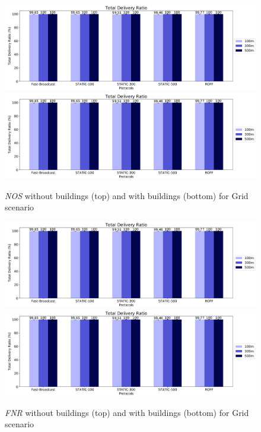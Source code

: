 		\begin{figure}[H]
			\centering
			\includegraphics[width=1.0\textwidth]{immagini/grid-300/b0/nos}
			\includegraphics[width=1.0\textwidth]{immagini/grid-300/b1/nos}
			\caption{\textit{NOS} without buildings (top) and with buildings (bottom) for Grid scenario}
			\label{fig:grid-nos}
		\end{figure}
	
		\begin{figure}[H]
			\centering
			\includegraphics[width=1.0\textwidth]{immagini/grid-300/b0/fnr}
			\includegraphics[width=1.0\textwidth]{immagini/grid-300/b1/fnr}
			\caption{\textit{FNR} without buildings (top) and with buildings (bottom) for Grid scenario}
			\label{fig:grid-fnr}
		\end{figure}


	